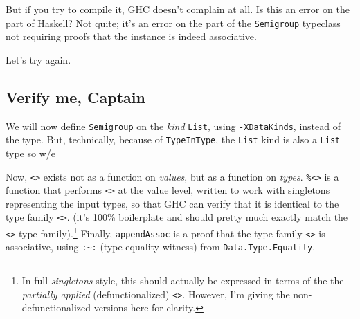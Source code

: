 \documentclass[]{article}
\newenvironment{Shaded}{}{}
\newcommand{\KeywordTok}[1]{\textcolor[rgb]{0.00,0.44,0.13}{\textbf{{#1}}}}
\newcommand{\DataTypeTok}[1]{\textcolor[rgb]{0.56,0.13,0.00}{{#1}}}
\newcommand{\OtherTok}[1]{\textcolor[rgb]{0.00,0.44,0.13}{{#1}}}
\newcommand{\FunctionTok}[1]{\textcolor[rgb]{0.02,0.16,0.49}{{#1}}}
\newcommand{\NormalTok}[1]{{#1}}
\begin{document}
But if you try to compile it, GHC doesn't complain at all. Is this an error on
the part of Haskell? Not quite; it's an error on the part of the
\texttt{Semigroup} typeclass not requiring proofs that the instance is indeed
associative.

Let's try again.

\subsection{Verify me, Captain}\label{verify-me-captain}

We will now define \texttt{Semigroup} on the \emph{kind} \texttt{List}, using
\texttt{-XDataKinds}, instead of the type. But, technically, because of
\texttt{TypeInType}, the \texttt{List} kind is also a \texttt{List} type so w/e

\begin{Shaded}
\end{Shaded}

Now, \texttt{\textless{}\textgreater{}} exists not as a function on
\emph{values}, but as a function on \emph{types}.
\texttt{\%\textless{}\textgreater{}} is a function that performs
\texttt{\textless{}\textgreater{}} at the value level, written to work with
singletons representing the input types, so that GHC can verify that it is
identical to the type family \texttt{\textless{}\textgreater{}}. (it's 100\%
boilerplate and should pretty much exactly match the
\texttt{\textless{}\textgreater{}} type family).\footnote{In full
  \emph{singletons} style, this should actually be expressed in terms of the the
  \emph{partially applied} (defunctionalized)
  \texttt{\textless{}\textgreater{}}. However, I'm giving the
  non-defunctionalized versions here for clarity.} Finally, \texttt{appendAssoc}
is a proof that the type family \texttt{\textless{}\textgreater{}} is
associative, using \texttt{:\textasciitilde{}:} (type equality witness) from
\texttt{Data.Type.Equality}.
\end{document}
